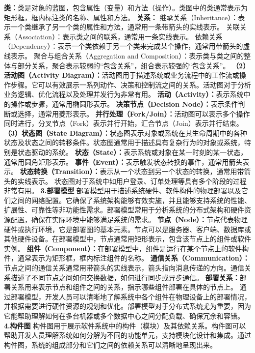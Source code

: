\textbf{类：}类是对象的蓝图，包含属性（变量）和方法（操作）。类图中的类通常表示为矩形框，框内标注类的名称、属性和方法。 \textbf{关系：}
继承关系（Inheritance）：表示一个类继承了另一个类的属性和方法，通常用一条带箭头的实线表示。 关联关系（Association）：表示类之间的联系，通常用一条实线表示。
依赖关系（Dependency）：表示一个类依赖于另一个类来完成某个操作，通常用带箭头的虚线表示。 聚合与组合关系（Aggregation and
Composition）：表示类与类之间的整体与部分关系，聚合表示较弱的``包含关系''，组合表示较强的``包含关系''。 \textbf{（2）活动图（Activity
Diagram）：}活动图用于描述系统或业务流程中的工作流或操作步骤。它可以有效展示一系列动作、决策和控制流之间的关系。活动图对于分析业务逻辑、优化流程以及处理并发行为非常有用。
\textbf{活动（Activity）：}表示系统中的操作或步骤，通常用椭圆形表示。 \textbf{决策节点（Decision Node）：}表示条件判断或选择，通常用菱形表示。
\textbf{并行处理（Fork/Join）：}活动图可以表示多个操作同时进行，分叉节点（Fork）表示并行开始，汇合节点（Join）表示并行结束。 \textbf{（3）状态图（State
Diagram）：}状态图表示对象或系统在其生命周期中的各种状态及状态之间的转移条件。状态图通常用于描述具有复杂行为的对象或系统，特别是状态驱动的系统。
\textbf{状态（State）：}表示系统或对象在某一时刻的某一状态，通常用圆角矩形表示。 \textbf{事件（Event）：}表示触发状态转换的事件，通常用箭头表示。
\textbf{状态转换（Transition）：}表示从一个状态到另一个状态的转换，通常用带箭头的实线表示。 状态图对于系统中如用户登录、订单处理等具有多个阶段的过程非常有用。 \textbf{3.部署模型}
部署模型用于描述系统硬件、软件构件的物理部署以及它们之间的网络配置。它确保了系统架构能够有效实施，并且能够支持系统的性能、扩展性、可靠性等非功能性需求。部署模型常用于分析系统的分布式架构和硬件资源配置，确保在实际环境中能够满足系统的需求。
\textbf{节点（Node）：}节点代表物理硬件或执行环境，它是部署图的基本元素。节点可以是服务器、客户端、数据库或其他硬件设备。在部署模型中，节点通常用矩形表示，包含该节点上的组件或软件实例。
\textbf{组件（Component）：}在部署模型中，组件是运行在某个节点上的软件构件，通常表示为矩形框，框内标注组件的名称。
\textbf{通信关系（Communication）：}节点之间的通信关系通常用带箭头的实线表示，箭头指向消息传递的方向。通信关系描述了不同节点之间如何交换数据，如何进行同步或异步通信。
\textbf{部署关系：}部署关系用来表示节点和组件之间的关系，指示哪些组件部署在具体的节点上。
通过部署模型，开发人员可以清晰地了解系统中各个组件在物理设备上的部署情况，并根据需要进行硬件资源的规划和优化。部署模型对于分布式系统尤为重要，因为它能帮助理解如何在多台机器或多个数据中心之间分配负载、确保冗余和容错。
\textbf{4.构件图} 构件图用于展示软件系统中的构件（模块）及其依赖关系。构件图可以帮助开发人员理解系统如何分解为不同的功能单元，支持模块化设计和集成。通过构件图，系统的组成部分和它们之间的依赖关系可以清晰地呈现出来。
